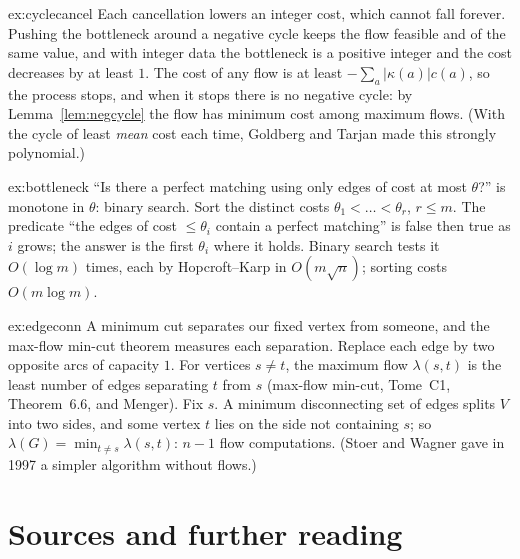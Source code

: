 \begin{solution}{ex:cyclecancel}
\idea Each cancellation lowers an integer cost, which cannot fall forever.
\writeup Pushing the bottleneck around a negative cycle keeps the flow feasible and of the same value, and with integer data the bottleneck is a positive integer and the cost decreases by at least $1$. The cost of any flow is at least $-\sum_a|\kappa(a)|c(a)$, so the process stops,
and when it stops there is no negative cycle: by Lemma~\ref{lem:negcycle} the flow has minimum cost among maximum flows. (With the cycle of least \emph{mean} cost each time, Goldberg and Tarjan made this strongly polynomial.)
\end{solution}

\begin{solution}{ex:bottleneck}
\idea ``Is there a perfect matching using only edges of cost at most $\theta$?'' is monotone in $\theta$: binary search.
\writeup Sort the distinct costs $\theta_1<\dots<\theta_r$, $r\le m$. The predicate ``the edges of cost $\le\theta_i$ contain a perfect matching'' is false then true as $i$ grows; the answer is the first $\theta_i$ where it holds. Binary search tests it $O(\log m)$ times, each by Hopcroft--Karp
in $O(m\sqrt n)$; sorting costs $O(m\log m)$.
\end{solution}

\begin{solution}{ex:edgeconn}
\idea A minimum cut separates our fixed vertex from someone, and the max-flow min-cut theorem measures each separation.
\writeup Replace each edge by two opposite arcs of capacity $1$. For vertices $s\ne t$, the maximum flow $\lambda(s,t)$ is the least number of edges separating $t$ from $s$ (max-flow min-cut, Tome~C1, Theorem~6.6, and Menger). Fix $s$. A minimum disconnecting set of edges splits $V$ into two sides,
and some vertex $t$ lies on the side not containing $s$; so $\lambda(G)=\min_{t\ne s}\lambda(s,t)$: $n-1$ flow computations. (Stoer and Wagner gave in 1997 a simpler algorithm without flows.)
\end{solution}

\section*{Sources and further reading}

